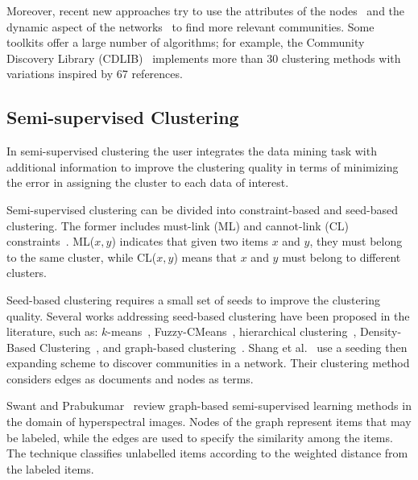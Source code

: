 Moreover, recent new approaches try to use the attributes of the nodes~\cite{yang2013community} and the dynamic aspect of the networks~\cite{rossetiSurvey} to find more relevant communities. Some toolkits offer a large number of algorithms; for example, the Community Discovery Library (CDLIB)~\cite{cdlib} implements more than 30 clustering methods with variations inspired by 67 references.



\subsection{Semi-supervised Clustering}\label{sec:semisupervised}

In semi-supervised clustering the user integrates the data mining task with additional information to improve the clustering quality in terms of minimizing the error in assigning the cluster to each data of interest.

Semi-supervised clustering can be divided into constraint-based and seed-based clustering.
The former includes must-link (ML) and cannot-link (CL) constraints~\cite{basu08, wagstaff2001constrained}. ML($x,y$) indicates that given two items $x$ and $y$, they must belong to the same cluster, while CL($x,y$) means that $x$ and $y$ must belong to different clusters.

Seed-based clustering requires a small set of seeds to improve the clustering quality. Several works addressing seed-based clustering have been proposed in the literature, such as: $k$-means~\cite{basu02}, Fuzzy-CMeans~\cite{bensaid96}, hierarchical clustering~\cite{bohm08}, Density-Based Clustering~\cite{lelis09}, and graph-based clustering~\cite{wagstaff2001constrained}.
Shang et al.~\cite{shang2017efficiently} use a seeding then expanding scheme to discover communities in a network. Their clustering method considers edges as documents and nodes as terms.

Swant and Prabukumar~\cite{SAWANT2018} review graph-based semi-supervised learning methods in the domain of hyperspectral images.
Nodes of the graph represent items that may be labeled, while the edges are used to specify the similarity among the items.
The technique classifies unlabelled items according to the weighted distance from the labeled items.


